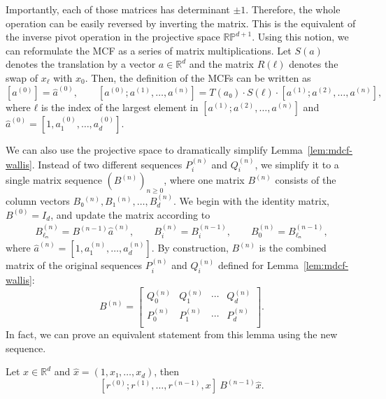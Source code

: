 Importantly, each of those matrices has
determinant $±1$.
Therefore, the whole operation can be easily reversed by inverting the matrix.
This is the equivalent of the inverse pivot operation in
the projective space $\mathbb{RP}^{d+1}$.
Using this notion, we can reformulate the MCF as a series of matrix multiplications.
Let $S(a)$ denotes the translation by a vector $a ∈ ℝ^d$
and the matrix $R(ℓ)$ denotes the swap of $x_ℓ$ with $x_0$.
Then, the definition of the MCFs can be written as
\[
  [a^{(0)}] = \hat a^{(0)}, \qquad
  [a^{(0)}; a^{(1)}, …, a^{(n)}] = T(a₀) · S(ℓ) · [a^{(1)}; a^{(2)}, …, a^{(n)}],
\]
where $ℓ$ is the index of the largest element in $[a^{(1)}; a^{(2)}, …, a^{(n)}]$ and $\hat a^{(0)} = [1, a_1^{(0)}, …, a_d^{(0)}]$.

We can also use the projective space to dramatically simplify Lemma~\ref{lem:mdcf-wallis}.
Instead of two different sequences $P_i^{(n)}$ and $Q_i^{(n)}$, we simplify it to a single matrix sequence $(B^{(n)})_{n ≥ 0}$,
where one matrix $B^{(n)}$ consists of the column vectors $B₀^{(n)}, B₁^{(n)}, …, B_d^{(n)}$.
We begin with the identity matrix, $B^{(0)} = I_d$, and update the matrix according to
\begin{align*}
  B_{ℓₙ}^{(n)} = B^{(n-1)} \hat a^{(n)},
  \qquad B_i^{(n)} = B_i^{(n-1)},
  \qquad B_0^{(n)} = B_{ℓₙ}^{(n-1)},
\end{align*}
where $\hat a^{(n)} = [1, a_1^{(n)}, …, a_d^{(n)}]$.
By construction, $B^{(n)}$ is the combined matrix of the original sequences
$P_i^{(n)}$ and $Q_i^{(n)}$ defined for Lemma~\vref{lem:mdcf-wallis}:
\[
  B^{(n)} = \begin{bmatrix}
    Q_0^{(n)} & Q_1^{(n)} & ⋯ & Q_d^{(n)} \\
    P_0^{(n)} & P_1^{(n)} & ⋯ & P_d^{(n)} \\
  \end{bmatrix}.
\]
In fact, we can prove an equivalent statement from this lemma using the new sequence.

\begin{lemma}
  \label{lem:mdcf-wallis'}
  Let $x ∈ ℝ^d$ and $\hat x = (1, x₁, …, x_d)$, then
  \[
    [r^{(0)}; r^{(1)}, …, r^{(n-1)}, x] ~ B^{(n-1)} \hat x.
  \]
\end{lemma}

